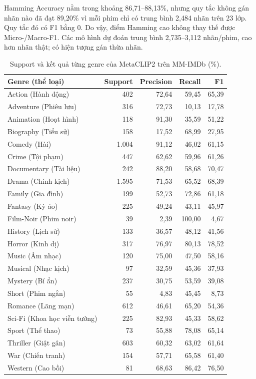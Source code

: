 \documentclass[12pt,a4paper]{article}
\begin{document}
Hamming Accuracy nằm trong khoảng 86,71--88,13\%, nhưng quy tắc không gán nhãn nào đã đạt 89,20\% vì mỗi phim chỉ có trung bình 2,484 nhãn trên 23 lớp. Quy tắc đó có F1 bằng 0. Do vậy, điểm Hamming cao không thay thế được Micro-/Macro-F1. Các mô hình dự đoán trung bình 2,735--3,112 nhãn/phim, cao hơn nhãn thật; có hiện tượng gán thừa nhãn.
\begin{table}[H]\centering\small
\caption{Support và kết quả từng genre của MetaCLIP2 trên MM-IMDb (\%).}\label{tab:mm-perclass}
\begin{tabular}{p{}rrrr}\toprule
\textbf{Genre (thể loại)}&\textbf{Support}&\textbf{Precision}&\textbf{Recall}&\textbf{F1}\\\midrule
Action (Hành động)&402&72,64&59,45&65,39\\
Adventure (Phiêu lưu)&316&72,73&10,13&17,78\\
Animation (Hoạt hình)&118&91,30&35,59&51,22\\
Biography (Tiểu sử)&158&17,52&68,99&27,95\\
Comedy (Hài)&1.004&91,12&46,02&61,15\\
Crime (Tội phạm)&447&62,62&59,96&61,26\\
Documentary (Tài liệu)&242&88,20&58,68&70,47\\
Drama (Chính kịch)&1.595&71,53&65,52&68,39\\
Family (Gia đình)&199&52,73&72,86&61,18\\
Fantasy (Kỳ ảo)&225&49,24&43,11&45,97\\
Film-Noir (Phim noir)&39&2,39&100,00&4,67\\
History (Lịch sử)&133&36,57&48,12&41,56\\
Horror (Kinh dị)&317&76,97&80,13&78,52\\
Music (Âm nhạc)&120&75,00&47,50&58,16\\
Musical (Nhạc kịch)&97&32,59&45,36&37,93\\
Mystery (Bí ẩn)&237&30,75&53,59&39,08\\
Short (Phim ngắn)&55&4,83&45,45&8,73\\
Romance (Lãng mạn)&612&46,61&65,20&54,36\\
Sci-Fi (Khoa học viễn tưởng)&225&82,93&45,33&58,62\\
Sport (Thể thao)&73&55,88&78,08&65,14\\
Thriller (Giật gân)&603&60,32&63,02&61,64\\
War (Chiến tranh)&154&57,71&65,58&61,40\\
Western (Cao bồi)&81&68,63&86,42&76,50\\
\bottomrule\end{tabular}\end{table}
\end{document}
